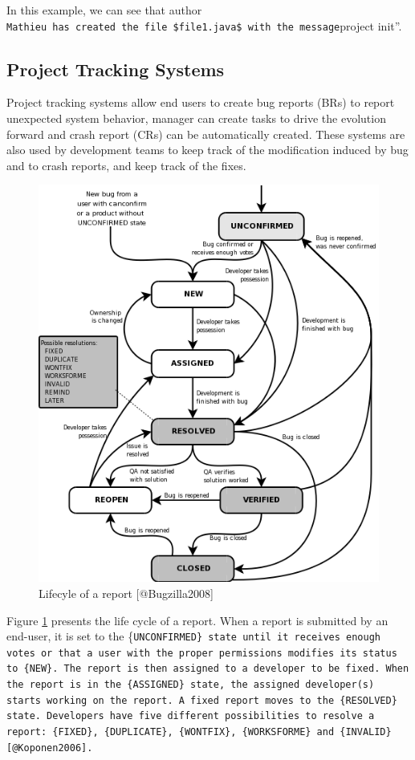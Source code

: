 In this example, we can see that author
\texttt{Mathieu\textquotesingle{}\textquotesingle{}\ has\ created\ the\ file\ \$file1.java\$\ with\ the\ message}project
init''.

\subsection{Project Tracking Systems\label{sec:issue-tracking}}

Project tracking systems allow end users to create bug reports (BRs) to
report unexpected system behavior, manager can create tasks to drive the
evolution forward and crash report (CRs) can be automatically created.
These systems are also used by development teams to keep track of the
modification induced by bug and to crash reports, and keep track of the
fixes.

\begin{figure}[h!]
    \centering
    \includegraphics[scale=0.5]{media/bzLifecycle.png}
    \caption{Lifecyle of a report [@Bugzilla2008]}
    \label{fig:bug-lifecyle}
\end{figure}

Figure \ref{fig:bug-lifecyle} presents the life cycle of a report. When
a report is submitted by an end-user, it is set to the
\{\tt UNCONFIRMED\} state until it receives enough votes or that a user
with the proper permissions modifies its status to \{\tt NEW\}. The
report is then assigned to a developer to be fixed. When the report is
in the \{\tt ASSIGNED\} state, the assigned developer(s) starts working
on the report. A fixed report moves to the \{\tt RESOLVED\} state.
Developers have five different possibilities to resolve a report:
\{\tt FIXED\}, \{\tt DUPLICATE\}, \{\tt WONTFIX\}, \{\tt WORKSFORME\}
and \{\tt INVALID\} {[}@Koponen2006{]}.

